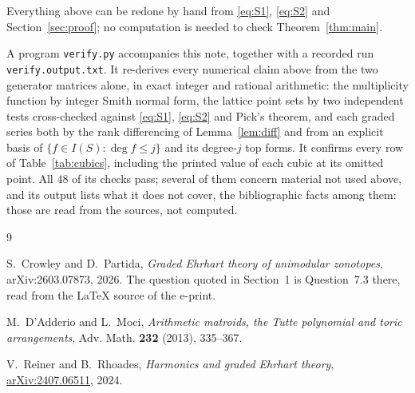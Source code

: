 \documentclass[11pt]{amsart}
\theoremstyle{definition}
\begin{document}
Everything above can be redone by hand from \eqref{eq:S1}, \eqref{eq:S2} and
Section~\ref{sec:proof}; no computation is needed to check Theorem~\ref{thm:main}.

A program \texttt{verify.py} accompanies this note, together with a recorded run
\texttt{verify.output.txt}. It re-derives every numerical claim above from the two generator
matrices alone, in exact integer and rational arithmetic: the multiplicity function by integer
Smith normal form, the lattice point sets by two independent tests cross-checked against
\eqref{eq:S1}, \eqref{eq:S2} and Pick's theorem, and each graded series both by the rank
differencing of Lemma~\ref{lem:diff} and from an explicit basis of $\{f\in I(S):\deg f\le j\}$ and
its degree-$j$ top forms. It confirms every row of Table~\ref{tab:cubics}, including the printed
value of each cubic at its omitted point. All $48$ of its checks pass; several of them concern
material not used above, and its output lists what it does not cover, the bibliographic facts among
them: those are read from the sources, not computed.

\begin{thebibliography}{9}

S.~Crowley and D.~Partida,
\emph{Graded Ehrhart theory of unimodular zonotopes},
arXiv:2603.07873, 2026.
The question quoted in Section~1 is Question~7.3 there, read from the \LaTeX{} source of the
e-print.

M.~D'Adderio and L.~Moci,
\emph{Arithmetic matroids, the Tutte polynomial and toric arrangements},
Adv. Math. \textbf{232} (2013), 335--367.

V.~Reiner and B.~Rhoades,
\emph{Harmonics and graded Ehrhart theory},
\href{https://arxiv.org/abs/2407.06511}{arXiv:2407.06511}, 2024.

\end{thebibliography}
\end{document}
